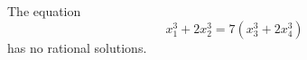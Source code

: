 \begin{proposition}
    The equation
\[
    x_1^3+2x_2^3=7(x_3^3+2x_4^3)
\]
    has no rational solutions.
\end{proposition}
